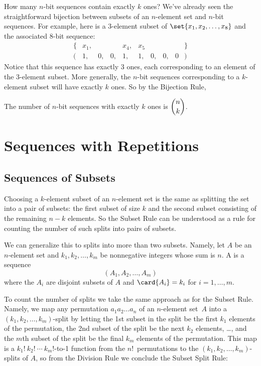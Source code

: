 How many $n$-bit sequences contain exactly $k$ ones?  We've already seen
the straightforward bijection between subsets of an $n$-element set and
$n$-bit sequences.  For example, here is a 3-element subset of $\set{x_1,
x_2, \ldots, x_8}$ and the associated 8-bit sequence:
%
\[
\begin{array}{rccccccccl}
\{ & x_1, &    &    & x_4, & x_5  &    &    &   & \} \\
(  &   1, & 0, & 0, &   1, &   1, & 0, & 0, & 0 & )
\end{array}
\]
Notice that this sequence has exactly 3 ones, each corresponding to an
element of the 3-element subset.  More generally, the $n$-bit sequences
corresponding to a $k$-element subset will have exactly $k$ ones.  So by
the Bijection Rule,
\begin{corollary*}
The number of $n$-bit sequences with exactly $k$ ones is $\dbinom{n}{k}$.
\end{corollary*}

\section{Sequences with Repetitions}\label{bookkeeper_sec}

\subsection{Sequences of Subsets}

Choosing a $k$-element subset of an $n$-element set is the same as
splitting the set into a pair of subsets: the first subset of size $k$ and
the second subset consisting of the remaining $n-k$ elements.  So the
Subset Rule can be understood as a rule for counting the number of such
splits into pairs of subsets.

We can generalize this to splits into more than two subsets.  Namely, let
$A$ be an $n$-element set and $k_1,k_2, \dots, k_m$ be nonnegative integers
whose sum is $n$.  A  is a
sequence
\[
(A_1, A_2,\dots,A_m)
\]
where the $A_i$ are disjoint subsets of $A$ and $\card{A_i} = k_i$ for
$i=1,\dots,m$.

To count the number of splits we take the same approach as for the
Subset Rule.  Namely, we map any permutation $a_1a_2\dots a_n$ of an
$n$-element set~$A$ into a $(k_1,k_2, \dots, k_m)$-split by letting
the 1st subset in the split be the first $k_1$ elements of the
permutation, the 2nd subset of the split be the next $k_2$ elements,
\dots, and the $m$th subset of the split be the final $k_m$ elements
of the permutation.  This map is a
\hbox{$k_1!\ k_2!\ \cdots\ k_m!$-to-1} function from the
$n!$~permutations to the $(k_1,k_2, \dots, k_m)$-splits of $A$, so
from the Division Rule we conclude the Subset Split Rule:

